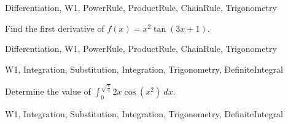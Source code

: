 
\begin{tagblock}{Differentiation, W1, PowerRule, ProductRule, ChainRule, Trigonometry}
\begin{question}
	

\bigskip

Find the first derivative of $f(x)=x^2\tan(3x+1)$.

\bigskip


	
	
\begin{tags}
	    Differentiation, W1, PowerRule, ProductRule, ChainRule, Trigonometry
\end{tags}
	
\begin{diary}
\end{diary}
	
\begin{solution}
	   
\end{solution}
	
\end{question}

\end{tagblock}


\begin{tagblock}{W1, Integration, Substitution, Integration, Trigonometry, DefiniteIntegral}
\begin{question}
	

\bigskip

Determine the value of $\displaystyle\int_0^{\sqrt{\frac {\pi} 4}} 2x\cos(x^2) \ dx$.

\bigskip


	
	
\begin{tags}
	    W1, Integration, Substitution, Integration, Trigonometry, DefiniteIntegral
\end{tags}
	
\begin{diary}
\end{diary}
	
\begin{solution}
	   
\end{solution}
	
\end{question}

\end{tagblock}
